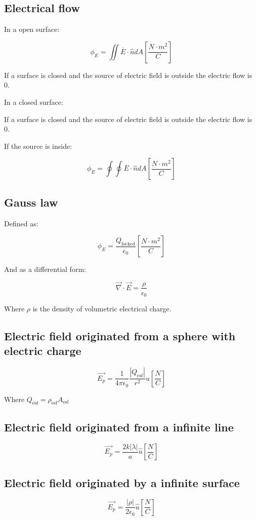 \documentclass[letterpaper]{article}
\newcommand{\divline}{\noindent\makebox[\linewidth]{\rule{\textwidth}{0.4pt}}}
\begin{document}
    \divline
    \begin{multicols}{2}
        \section{Electrical flow}
        In a open surface:

        \[\phi_{E} = \iint \overline{E} \cdot \hat{n} dA \left[ \frac{N \cdot m^{2}}{C} \right] \]

        If a surface is closed and the source of electric field is outside the electric flow is 0.

        In a closed surface:

        If a surface is closed and the source of electric field is outside the electric flow is 0.

        If the source is inside:

        \[\phi_{E} = \oint\oint \overline{E} \cdot \hat{n} dA \left[ \frac{N \cdot m^{2}}{C} \right] \]
    \end{multicols}

    \divline
    \begin{multicols}{2}
        \section{Gauss law}

        Defined as:
        
        \[\phi_{E} = \frac{Q_{\text{locked}}}{\epsilon_{0}} \left[ \frac{N \cdot m^{2}}{C} \right] \]

        And as a differential form:

        \[\overrightarrow{\nabla} \cdot \overrightarrow{E} = \frac{\rho}{\epsilon_{0}}\]

        Where \(\rho\) is the density of volumetric electrical charge.

        \subsection{Electric field originated from a sphere with electric charge}

        \[\overrightarrow{E_{p}} = \frac{1}{4 \pi \epsilon_{0}} \frac{|Q_{\text{esf}}|}{r^{2}} \hat{u} \left[ \frac{N}{C} \right] \]

        Where \(Q_{\text{esf}} = \rho_{\text{esf}}A_{\text{esf}}\)

        \subsection{Electric field originated from a infinite line}

        \[\overrightarrow{E_{p}} = \frac{2k |\lambda|}{a} \hat{u} \left[ \frac{N}{C} \right] \]

        \subsection{Electric field originated by a infinite surface}

        \[\overrightarrow{E_{p}} = \frac{|\rho|}{2\epsilon_{0}} \hat{u} \left[ \frac{N}{C} \right]\]
    \end{multicols}
    
\end{document}
